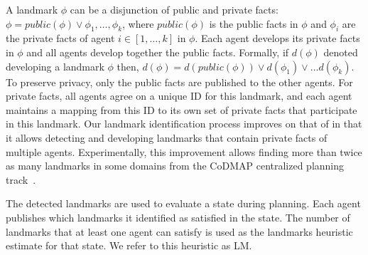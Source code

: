\documentclass[letterpaper]{article}
\newcommand{\public}{\textit{public}}
\theoremstyle{definition}
\begin{document}
A landmark $\phi$ can be a disjunction of public and private facts: $\phi=\public(\phi)\vee \phi_1,\ldots,\phi_k$, 
where $\public(\phi)$ is the public facts in $\phi$ and $\phi_i$ are the private facts of agent $i\in[1,\ldots,k]$ in $\phi$. 
Each agent develops its private facts in $\phi$ and all agents develop together the public facts. Formally, if
 $d(\phi)$ denoted developing a landmark $\phi$ then, $d(\phi)=d(\public(\phi))\vee d(\phi_1) \vee \dots d(\phi_k)$. 
To preserve privacy, only the public facts are published to the other agents. For private facts, all agents agree on a unique ID for this landmark, and each agent maintains a mapping from this ID to its own set of private facts that participate in this landmark. 
Our landmark identification process improves on that of \cite{maliah2014privacyPreserving} in that it allows detecting and developing landmarks that contain private facts of multiple agents. Experimentally, this improvement allows finding more than twice as many landmarks in some domains from the CoDMAP centralized planning track~\cite{vstolba2015competition}. 


The detected landmarks are used to evaluate a state during planning. Each agent publishes which landmarks it identified as satisfied in the state. The number of landmarks that at least one agent can satisfy is used as the landmarks heuristic estimate for that state. We refer to this heuristic as LM. 






\end{document}
